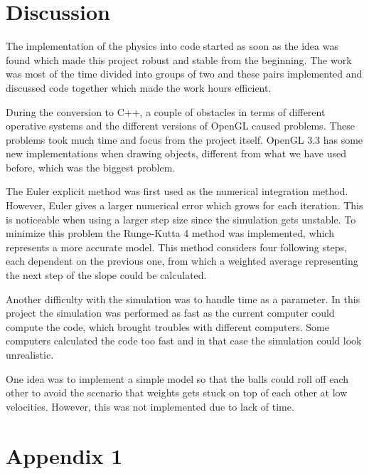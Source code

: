 \documentclass[a4paper,12pt,twoside,english]{article}
\begin{document}
\section{Discussion}
The implementation of the physics into code started as soon as the idea was found which made this project robust and stable from the beginning.
The work was most of the time divided into groups of two and these pairs implemented and discussed code together which made the work hours efficient.

During the conversion to C++, a couple of obstacles in terms of different operative systems and the different versions of OpenGL caused problems. These problems took much time and focus from the project itself. OpenGL 3.3 has some new implementations when drawing objects, different from what we have used before, which was the biggest problem.

The Euler explicit method was first used as the numerical integration method. However, Euler gives a larger numerical error which grows for each iteration. This is noticeable when using a larger step size since the simulation gets unstable. To minimize this problem the Runge-Kutta 4 method was implemented, which represents a more accurate model. This method considers four following steps, each dependent on the previous one, from which a weighted average representing the next step of the slope could be calculated. 

Another difficulty with the simulation was to handle time as a parameter. In this project the simulation was performed as fast as the current computer could compute the code, which brought troubles with different computers. Some computers calculated the code too fast and in that case the simulation could look unrealistic.

One idea was to implement a simple model so that the balls could roll off each other to avoid the scenario that weights gets stuck on top of each other at low velocities. However, this was not implemented due to lack of time. 

\newpage



\newpage
{}
\section*{Appendix 1}
\end{document}

